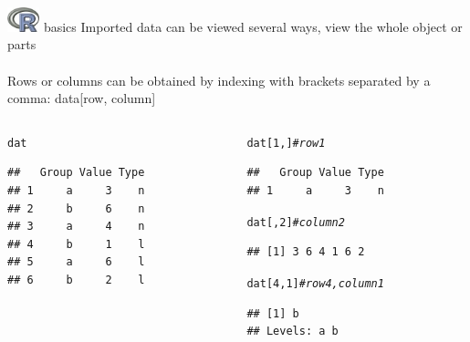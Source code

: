 \documentclass[xcolor=svgnames]{beamer}\usepackage[]{graphicx}\usepackage[]{color}
\makeatletter
\newcommand{\hlnum}[1]{\textcolor[rgb]{0.686,0.059,0.569}{#1}}%
\newcommand{\hlcom}[1]{\textcolor[rgb]{0.678,0.584,0.686}{\textit{#1}}}%
\newcommand{\hlstd}[1]{\textcolor[rgb]{0.345,0.345,0.345}{#1}}%
\newenvironment{kframe}{%
 \def\at@end@of@kframe{}%
 \ifinner\ifhmode%
  \def\at@end@of@kframe{\end{minipage}}%
  \begin{minipage}{\columnwidth}%
 \fi\fi%
 \def\FrameCommand##1{\hskip\@totalleftmargin \hskip-\fboxsep
 \colorbox{shadecolor}{##1}\hskip-\fboxsep
     \hskip-\linewidth \hskip-\@totalleftmargin \hskip\columnwidth}%
 \MakeFramed {\advance\hsize-\width
   \@totalleftmargin\z@ \linewidth\hsize
   \@setminipage}}%
 {\par\unskip\endMakeFramed%
 \at@end@of@kframe}
\newenvironment{knitrout}{}{} %
\makeatother
\begin{document}
\begin{frame}{\includegraphics[width=0.07\textwidth]{Rlogo.jpg} \hspace{0.01in} basics}
Imported data can be viewed several ways, view the whole object or parts \\~\\
Rows or columns can be obtained by indexing with brackets separated by a comma: data[row, column]
\vspace{-0.3in}
\begin{columns}[t]
\begin{column}{0.45\textwidth}
\begin{knitrout}
\color{fgcolor}\begin{kframe}
\begin{alltt}
\hlstd{dat}
\end{alltt}
\begin{verbatim}
##   Group Value Type
## 1     a     3    n
## 2     b     6    n
## 3     a     4    n
## 4     b     1    l
## 5     a     6    l
## 6     b     2    l
\end{verbatim}
\end{kframe}
\end{knitrout}
\end{column}

\begin{column}{0.45\textwidth}
\begin{knitrout}
\color{fgcolor}\begin{kframe}
\begin{alltt}
\hlstd{dat[}\hlnum{1}\hlstd{, ]} \hlcom{# row 1}
\end{alltt}
\begin{verbatim}
##   Group Value Type
## 1     a     3    n
\end{verbatim}
\begin{alltt}
\hlstd{dat[,} \hlnum{2}\hlstd{]} \hlcom{# column 2}
\end{alltt}
\begin{verbatim}
## [1] 3 6 4 1 6 2
\end{verbatim}
\begin{alltt}
\hlstd{dat[}\hlnum{4}\hlstd{,} \hlnum{1}\hlstd{]} \hlcom{# row 4, column 1}
\end{alltt}
\begin{verbatim}
## [1] b
## Levels: a b
\end{verbatim}
\end{kframe}
\end{knitrout}
\end{column}
\end{columns}
\end{frame}
\end{document}
